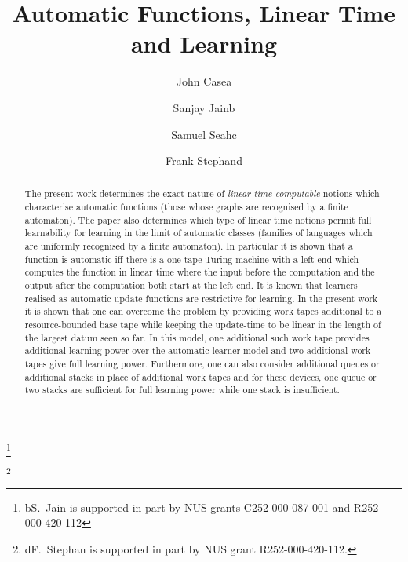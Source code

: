 \documentclass{LMCS}
\theoremstyle{plain}\newtheorem{athm}[thm]{Theorem}
\theoremstyle{plain}\newtheorem{aprop}[thm]{Proposition}
\theoremstyle{plain}\newtheorem{aprob}[thm]{Open Problem}
\theoremstyle{plain}\newtheorem{acor}[thm]{Corollary}
\theoremstyle{plain}\newtheorem{alem}[thm]{Lemma}
\theoremstyle{definition}\newtheorem{adefn}[thm]{Definition}
\theoremstyle{definition}\newtheorem{arem}[thm]{Remark}
\theoremstyle{plain}\newtheorem{aexmp}[thm]{Example}
\theoremstyle{plain}\newtheorem{aclm}[thm]{Claim}
\begin{document}
\title[Automatic functions, linear time and learning]{Automatic
Functions, Linear Time and Learning\rsuper*}
\author[J.~Case]{John Case\rsuper a}\address{{\lsuper a}Department of Computer and Information Sciences,
University of Dela\-ware, Newark, DE 19716-2586, USA}

\author[S.~Jain]{Sanjay Jain\rsuper b}\address{{\lsuper b}Department of Computer Science, National University
of Singapore, Singapore 117417, Republic of Singapore}
\thanks{{\lsuper b}S.~Jain is supported in part by NUS grants C252-000-087-001 and
R252-000-420-112}

\author[S.~Seah]{Samuel Seah\rsuper c}\address{{}Department of Mathematics, National
University of Singapore, 10 Lower Kent Ridge Road,
Singapore 119076, Republic of Singapore}

\author[F.~Stephan]{Frank Stephan\rsuper d}
\thanks{{\lsuper d}F.~Stephan is supported in part by NUS grant
R252-000-420-112.}

\begin{abstract}
\noindent
The present work determines the exact nature of {\em linear time computable\/}
notions which characterise automatic functions (those whose graphs are 
recognised by a finite automaton).
The paper also determines which type of
linear time notions permit full learnability for learning in the limit
of automatic classes (families of languages which are
uniformly recognised by a finite automaton). In particular it is shown
that a function is automatic
iff there is a one-tape Turing machine with a left end which computes the
function in linear time where the input before the computation and the
output after the computation both start at the left end. It is known
that learners realised as automatic update functions are restrictive for
learning. In the present work it is shown that one can overcome the problem
by providing work tapes additional to a resource-bounded base tape while
keeping the update-time to be linear in the length of the largest datum
seen so far.
In this model, one additional such work tape provides additional learning
power over the automatic learner model and two additional work tapes
give full learning power. Furthermore, one can also consider additional
queues or additional stacks in place of additional work tapes and for
these devices, one queue or two stacks are sufficient for full learning
power while one stack is insufficient.
\end{abstract}
\end{document}
